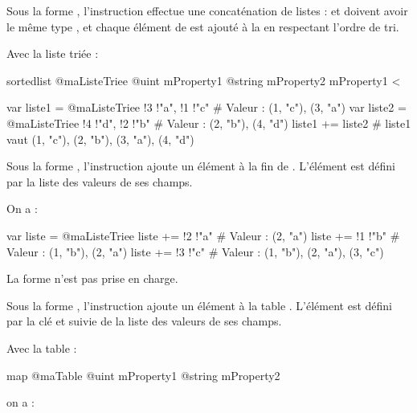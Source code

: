 
Sous la forme , l'instruction effectue une concaténation de listes :  et  doivent avoir le même type , et chaque élément de  est ajouté à la  en respectant l'ordre de tri.

Avec la liste triée :
\begin{galgascode}
sortedlist @maListeTriee {
  @uint mProperty1
  @string mProperty2
}{
  mProperty1 <
}
\end{galgascode}

\begin{galgascode}
var liste1 = @maListeTriee {!3 !"a", !1 !"c"} # Valeur : (1, "c"), (3, "a")
var liste2 = @maListeTriee {!4 !"d", !2 !"b"} # Valeur : (2, "b"), (4, "d")
liste1 += liste2 # liste1 vaut (1, "c"), (2, "b"), (3, "a"), (4, "d")
\end{galgascode}



Sous la forme , l'instruction ajoute un élément à la fin de . L'élément est défini par la liste des valeurs de ses champs.


On a :

\begin{galgascode}
var liste = @maListeTriee {}
liste += !2 !"a" # Valeur : (2, "a")
liste += !1 !"b" # Valeur : (1, "b"), (2, "a")
liste += !3 !"c" # Valeur : (1, "b"), (2, "a"), (3, "c")
\end{galgascode}








La forme  n'est pas prise en charge.

Sous la forme , l'instruction ajoute un élément à la table . L'élément est défini par la clé et suivie de la liste des valeurs de ses champs.


Avec la table :
\begin{galgascode}
map @maTable {
  @uint mProperty1
  @string mProperty2
}
\end{galgascode}

on a :


